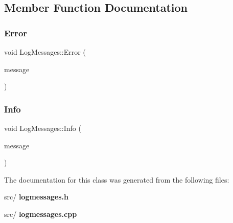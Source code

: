 \subsection{Member Function Documentation}
\mbox{\label{class_log_messages_a86c0e6eb4effe85e77f8bb161e6c1bb6}} 
\subsubsection{Error}
{\footnotesize\ttfamily void Log\+Messages\+::\+Error (\begin{DoxyParamCaption}\item[{Q\+String}]{message }\end{DoxyParamCaption})\hspace{0.3cm}{\ttfamily [slot]}}

\mbox{\label{class_log_messages_aa7e2b7fb9e3c056da22add88e90cc8fd}} 
\subsubsection{Info}
{\footnotesize\ttfamily void Log\+Messages\+::\+Info (\begin{DoxyParamCaption}\item[{Q\+String}]{message }\end{DoxyParamCaption})\hspace{0.3cm}{\ttfamily [slot]}}



The documentation for this class was generated from the following files\+:\begin{DoxyCompactItemize}
\item 
src/\textbf{ logmessages.\+h}\item 
src/\textbf{ logmessages.\+cpp}\end{DoxyCompactItemize}
